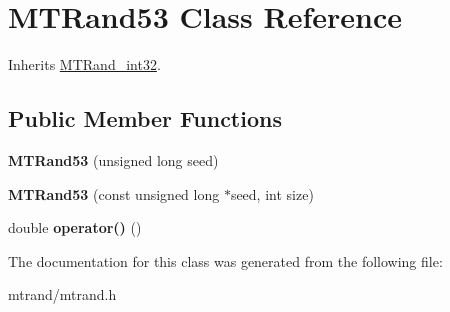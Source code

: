 \hypertarget{class_m_t_rand53}{
\section{\-M\-T\-Rand53 \-Class \-Reference}
\label{class_m_t_rand53}
}


\-Inherits \hyperlink{class_m_t_rand__int32}{\-M\-T\-Rand\-\_\-int32}.

\subsection*{\-Public \-Member \-Functions}
\begin{DoxyCompactItemize}
\item 
\hypertarget{class_m_t_rand53_ad800887e15d4095f22facdb67f270c5e}{
{\bfseries \-M\-T\-Rand53} (unsigned long seed)}
\label{class_m_t_rand53_ad800887e15d4095f22facdb67f270c5e}

\item 
\hypertarget{class_m_t_rand53_ac77b190d3ac27adea2d2c6c2ce2347c3}{
{\bfseries \-M\-T\-Rand53} (const unsigned long $\ast$seed, int size)}
\label{class_m_t_rand53_ac77b190d3ac27adea2d2c6c2ce2347c3}

\item 
\hypertarget{class_m_t_rand53_ab6657cb5349f39bc4553d3a970458b45}{
double {\bfseries operator()} ()}
\label{class_m_t_rand53_ab6657cb5349f39bc4553d3a970458b45}

\end{DoxyCompactItemize}


\-The documentation for this class was generated from the following file\-:\begin{DoxyCompactItemize}
\item 
mtrand/mtrand.\-h\end{DoxyCompactItemize}
